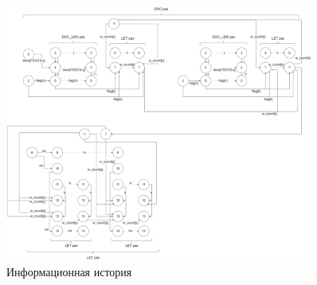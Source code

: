 \begin{figure}[h]
	\centering
	\includegraphics[width=0.9\textwidth]{img/dz-Информационная история.drawio.png}
	\caption{Информационная история}
	\label{fig:g34}
\end{figure}